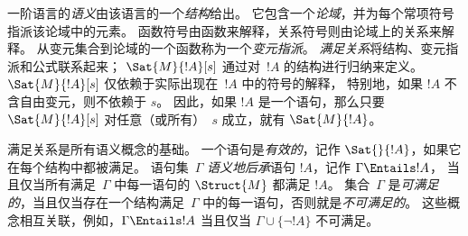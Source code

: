 一阶语言的\emph{语义}由该语言的一个\emph{结构}给出。
它包含一个\emph{论域}，并为每个常项符号指派该论域中的元素。
函数符号由函数来解释，关系符号则由论域上的关系来解释。
从变元集合到论域的一个函数称为一个\emph{变元指派}。
\emph{满足关系}将结构、变元指派和公式联系起来；
$\Sat{M}{!A}[s]$ 通过对~$!A$ 的结构进行归纳来定义。
$\Sat{M}{!A}[s]$ 仅依赖于实际出现在~$!A$ 中的符号的解释，
特别地，如果 $!A$ 不含自由变元，则不依赖于 $s$。
因此，如果 $!A$ 是一个语句，那么只要 $\Sat{M}{!A}[s]$ 对任意（或所有）~$s$ 成立，就有 $\Sat{M}{!A}$。

满足关系是所有语义概念的基础。
一个语句是\emph{有效的}，记作 $\Sat{{}}{!A}$，如果它在每个结构中都被满足。
语句集~$\Gamma$ \emph{语义地后承}语句 $!A$，记作 $\Gamma \Entails !A$，
当且仅当所有满足~$\Gamma$ 中每一语句的 $\Struct{M}$ 都满足 $!A$。
集合~$\Gamma$ 是\emph{可满足的}，当且仅当存在一个结构满足~$\Gamma$ 中的每一语句，否则就是\emph{不可满足的}。
这些概念相互关联，例如，$\Gamma \Entails !A$ 当且仅当 $\Gamma \cup \{\lnot !A\}$ 不可满足。